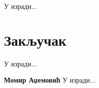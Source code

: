 \documentclass[11pt,oneside]{memoir}
\begin{document}
У изради...

\chapter{Закључак}
У изради...

\literatura

\backmatter

\begin{biografija}
\textbf{Момир Аџемовић} 
У изради...
\end{biografija}
\end{document}
